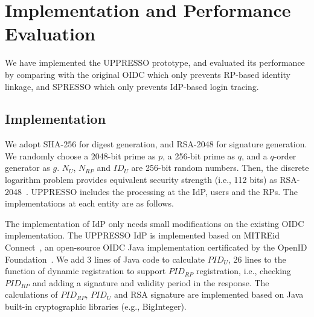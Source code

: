 \section{Implementation and Performance Evaluation}
\label{sec:implementation}
We have implemented the UPPRESSO prototype,
and evaluated its performance by comparing with the original OIDC which only prevents RP-based identity linkage,
 and SPRESSO which only prevents IdP-based login tracing.

\subsection{Implementation}
We adopt SHA-256 for digest generation, and  RSA-2048 for signature generation. %
We randomly choose a 2048-bit prime as $p$, a 256-bit prime as $q$, and a  $q$-order generator as $g$.
$N_U$, $N_{RP}$ and $ID_U$  are 256-bit random numbers.
Then, the discrete logarithm problem provides equivalent security strength (i.e., 112 bits) as RSA-2048~\cite{barkerecommendation}.
UPPRESSO includes the processing at the IdP, users and the RPs.
The implementations at each entity are as follows.

The implementation of IdP only needs small modifications on the existing OIDC implementation.
The UPPRESSO IdP is implemented based on MITREid Connect~\cite{MITREid}, an open-source OIDC Java implementation certificated by the OpenID Foundation~\cite{OIDF}.
We add 3 lines of Java code to calculate $PID_U$,
26 lines to the function of dynamic registration to support $PID_{RP}$ registration,
 i.e., checking $PID_{RP}$ and adding a signature and validity period in the response.  %
The calculations of $PID_{RP}$, $PID_U$ and RSA signature are implemented based on Java built-in cryptographic libraries (e.g., BigInteger).

